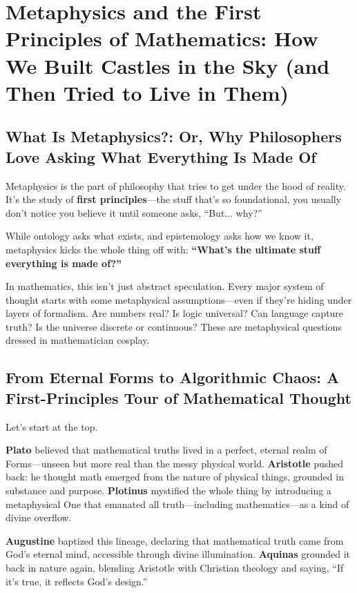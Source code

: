 \section{Metaphysics and the First Principles of Mathematics: How We Built Castles in the Sky (and Then Tried to Live in Them)}

\subsection{What Is Metaphysics?: Or, Why Philosophers Love Asking What Everything Is Made Of}

Metaphysics is the part of philosophy that tries to get under the hood of reality. It's the study of \textbf{first principles}—the stuff that’s so foundational, you usually don’t notice you believe it until someone asks, “But... why?”

While ontology asks what exists, and epistemology asks how we know it, metaphysics kicks the whole thing off with:  
\textbf{“What’s the ultimate stuff everything is made of?”}

In mathematics, this isn’t just abstract speculation. Every major system of thought starts with some metaphysical assumptions—even if they’re hiding under layers of formalism. Are numbers real? Is logic universal? Can language capture truth? Is the universe discrete or continuous? These are metaphysical questions dressed in mathematician cosplay.

\subsection{From Eternal Forms to Algorithmic Chaos: A First-Principles Tour of Mathematical Thought}

Let’s start at the top.

\textbf{Plato} believed that mathematical truths lived in a perfect, eternal realm of Forms—unseen but more real than the messy physical world.  
\textbf{Aristotle} pushed back: he thought math emerged from the nature of physical things, grounded in substance and purpose.  
\textbf{Plotinus} mystified the whole thing by introducing a metaphysical One that emanated all truth—including mathematics—as a kind of divine overflow.

\textbf{Augustine} baptized this lineage, declaring that mathematical truth came from God’s eternal mind, accessible through divine illumination.  
\textbf{Aquinas} grounded it back in nature again, blending Aristotle with Christian theology and saying, “If it’s true, it reflects God’s design.”

